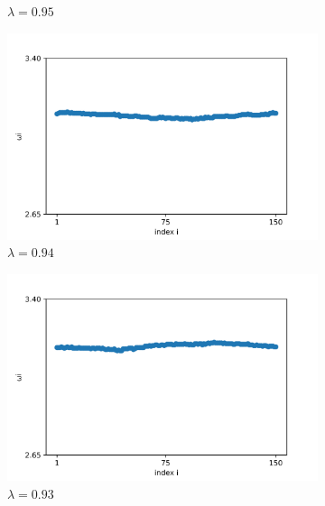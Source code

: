 \documentclass[a4paper,12pt]{article}
\begin{document}
\begin{figure}[H]
\begin{subfigure}{.32\textwidth}
  \caption{$\lambda=0.95$}
\end{subfigure}

\begin{subfigure}{.32\textwidth}
  \centering
  \includegraphics[width=1\linewidth]{w_lambda=0.94_t=2000.png}  
  \caption{$\lambda=0.94$}
\end{subfigure}
\hfill
\begin{subfigure}{.32\textwidth}
  \centering
  \includegraphics[width=1\linewidth]{w_lambda=0.93_t=2000.png}  
  \caption{$\lambda=0.93$}
\end{subfigure}
\hfill
\begin{subfigure}{.32\textwidth}
  \centering

\end{subfigure}
\end{figure}
\end{document}
